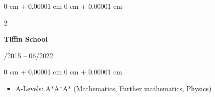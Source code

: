 \documentclass[10pt, letterpaper]{article}
\newenvironment{highlights}{
    \begin{itemize}[
        topsep=0.10 cm,
        parsep=0.10 cm,
        partopsep=0pt,
        itemsep=0pt,
        leftmargin=0 cm + 10pt
    ]
}{
    \end{itemize}
}
\newenvironment{onecolentry}{
    \begin{adjustwidth}{
        0 cm + 0.00001 cm
    }{
        0 cm + 0.00001 cm
    }
}{
    \end{adjustwidth}
}
\newenvironment{twocolentry}[2][]{
    \onecolentry
    \def\secondColumn{#2}
    \setcolumnwidth{\fill, 4.5 cm}
    \begin{paracol}{2}
}{
    \switchcolumn \raggedleft \secondColumn
    \end{paracol}
    \endonecolentry
} %
\begin{document}
        \vspace{0.2 cm}

        \begin{twocolentry}{
            09/2015 – 06/2022
        }
            \textbf{Tiffin School}
        \end{twocolentry}

        \vspace{0.10 cm}
        \begin{onecolentry}
            \begin{highlights}
                \item A-Levels: A*A*A* (Mathematics, Further mathematics, Physics)
            \end{highlights}
        \end{onecolentry}

        \vspace{0.2 cm}
\end{document}

